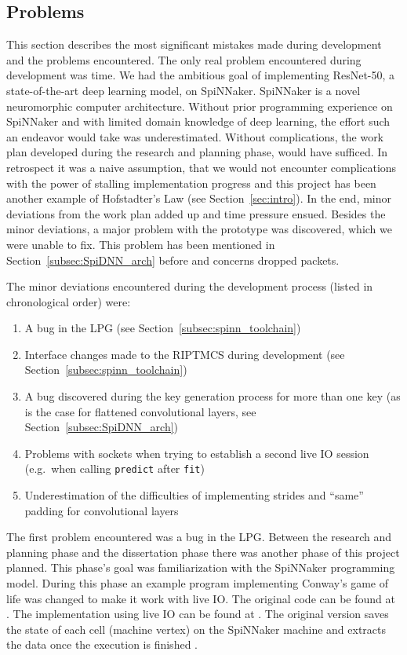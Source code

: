 \documentclass[]{article}
\begin{document}


\subsection{Problems} %
\label{subsec:problems}

This section describes the most significant mistakes made during
development and the problems encountered.
The only real problem encountered during development was time.
We had the ambitious goal of implementing ResNet-50, a
state-of-the-art deep learning model, on SpiNNaker.
SpiNNaker is a novel neuromorphic computer architecture.
Without prior programming experience on SpiNNaker and with limited
domain knowledge of deep learning, the effort such an endeavor would
take was underestimated.
Without complications, the work plan developed during the research and
planning phase, would have sufficed.
In retrospect it was a naive assumption, that we would not encounter
complications with the power of stalling implementation progress
and this project has been another example of Hofstadter's Law
(see Section~\ref{sec:intro}).
In the end, minor deviations from the work plan added up and time
pressure ensued.
Besides the minor deviations, a major problem with the prototype was
discovered, which we were unable to fix.
This problem has been mentioned in Section~\ref{subsec:SpiDNN_arch}
before and concerns dropped packets.

The minor deviations encountered during the development process
(listed in chronological order) were:

\begin{enumerate}
  \item A bug in the LPG (see Section~\ref{subsec:spinn_toolchain})
  \item Interface changes made to the RIPTMCS during development (see
    Section~\ref{subsec:spinn_toolchain})
  \item A bug discovered during the key generation process for more
    than one key (as is the case for flattened convolutional layers,
    see Section~\ref{subsec:SpiDNN_arch})
  \item Problems with sockets when trying to establish a second live
    IO session (e.g.\ when calling \texttt{predict} after
    \texttt{fit})
  \item Underestimation of the difficulties of implementing strides
    and ``same'' padding for convolutional layers
\end{enumerate}

The first problem encountered was a bug in the LPG.
Between the research and planning phase and the dissertation phase
there was another phase of this project planned.
This phase's goal was familiarization with the SpiNNaker programming
model.
During this phase an example program implementing Conway's game of
life \citep{gardener_1970, furber_et_al_2020} was changed to make it
work with live IO.
The original code can be found at \citet{spinnaker_2020b}.
The implementation using live IO can be found at
\citet{fassbender_2020}.
The original version saves the state of each cell (machine vertex)
on the SpiNNaker machine and extracts the data once the execution is
finished \citep{furber_et_al_2020, spinnaker_2020b}.
\end{document}
